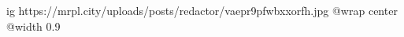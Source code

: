  
 
 
 
 

\ifcmt
  ig https://mrpl.city/uploads/posts/redactor/vaepr9pfwbxxorfh.jpg
  @wrap center
  @width 0.9
\fi

